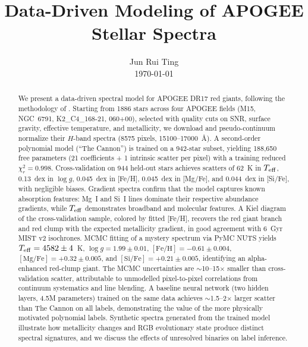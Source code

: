 \documentclass[10pt,preprint2]{aastex}
\begin{document}
\title{Data-Driven Modeling of APOGEE Stellar Spectra}
\author{Jun Rui Ting \\ \today\vspace{-2.5\baselineskip}}

\begin{abstract}
We present a data-driven spectral model for APOGEE DR17 red giants, following the methodology of \citet{Ness2015}. Starting from 1886 stars across four APOGEE fields (M15, NGC~6791, K2\_C4\_168-21, 060+00), selected with quality cuts on SNR, surface gravity, effective temperature, and metallicity, we download and pseudo-continuum normalize their $H$-band spectra (8575 pixels, 15100--17000~\AA). A second-order polynomial model (``The Cannon'') is trained on a 942-star subset, yielding 188,650 free parameters (21 coefficients + 1 intrinsic scatter per pixel) with a training reduced $\chi^2_r = 0.998$. Cross-validation on 944 held-out stars achieves scatters of 62~K in $T_{\rm eff}$, 0.13~dex in $\log g$, 0.045~dex in [Fe/H], 0.045~dex in [Mg/Fe], and 0.044~dex in [Si/Fe], with negligible biases. Gradient spectra confirm that the model captures known absorption features: Mg~I and Si~I lines dominate their respective abundance gradients, while $T_{\rm eff}$ demonstrates broadband and molecular features. A Kiel diagram of the cross-validation sample, colored by fitted [Fe/H], recovers the red giant branch and red clump with the expected metallicity gradient, in good agreement with 6~Gyr MIST v2 isochrones. MCMC fitting of a mystery spectrum via PyMC NUTS yields $T_{\rm eff} = 4582 \pm 4$~K, $\log g = 1.99 \pm 0.01$, $[\mathrm{Fe/H}] = -0.61 \pm 0.004$, $[\mathrm{Mg/Fe}] = +0.32 \pm 0.005$, and $[\mathrm{Si/Fe}] = +0.21 \pm 0.005$, identifying an alpha-enhanced red-clump giant. The MCMC uncertainties are $\sim$10--15$\times$ smaller than cross-validation scatter, attributable to unmodelled pixel-to-pixel correlations from continuum systematics and line blending. A baseline neural network (two hidden layers, 4.5M parameters) trained on the same data achieves $\sim$1.5--2$\times$ larger scatter than The Cannon on all labels, demonstrating the value of the more physically motivated polynomial labels. Synthetic spectra generated from the trained model illustrate how metallicity changes and RGB evolutionary state produce distinct spectral signatures, and we discuss the effects of unresolved binaries on label inference.

\vspace{2.5\baselineskip}
\end{abstract}
\end{document}
